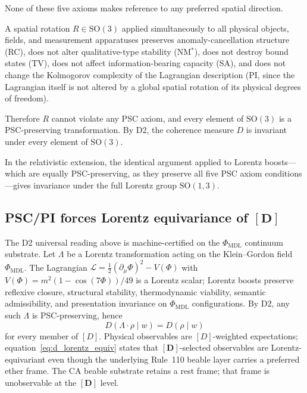 \documentclass[12pt,letterpaper]{article}
\newcommand{\Dclass}{[D]}
\begin{document}
None of these five axioms makes reference to any preferred spatial direction.

A spatial rotation $R \in \mathrm{SO}(3)$ applied simultaneously to all physical
objects, fields, and measurement apparatuses preserves anomaly-cancellation structure
(RC), does not alter qualitative-type stability (NM$^*$), does not destroy bound
states (TV), does not affect information-bearing capacity (SA), and does not change
the Kolmogorov complexity of the Lagrangian description (PI, since the Lagrangian
itself is not altered by a global spatial rotation of its physical degrees of
freedom).

Therefore $R$ cannot violate any PSC axiom, and every element of $\mathrm{SO}(3)$ is
a PSC-preserving transformation.  By D2, the coherence measure $D$ is invariant under
every element of $\mathrm{SO}(3)$.

In the relativistic extension, the identical argument applied to Lorentz
boosts---which are equally PSC-preserving, as they preserve all five PSC axiom
conditions---gives invariance under the full Lorentz group $\mathrm{SO}(1,3)$.

\subsection{PSC/PI forces Lorentz equivariance of \texorpdfstring{$[\mathbf{D}]$}{[D]}}
\label{sec:psc_pi_lorentz}

The D2 universal reading above is machine-certified on the $\Phi_{\mathrm{MDL}}$
continuum substrate.
Let $\Lambda$ be a Lorentz transformation acting on the Klein--Gordon field
$\Phi_{\mathrm{MDL}}$.
The Lagrangian
$\mathcal{L} = \tfrac{1}{2}(\partial_\mu\Phi)^2 - V(\Phi)$ with
$V(\Phi) = m^2(1-\cos(7\Phi))/49$ is a Lorentz scalar; Lorentz boosts preserve
reflexive closure, structural stability, thermodynamic viability, semantic
admissibility, and presentation invariance on $\Phi_{\mathrm{MDL}}$ configurations.
By D2, any such $\Lambda$ is PSC-preserving, hence
\begin{equation}
  D(\Lambda\cdot\rho \mid w) = D(\rho \mid w)
  \label{eq:d_lorentz_equiv}
\end{equation}
for every member of $\Dclass$.
Physical observables are $\Dclass$-weighted expectations; equation~\eqref{eq:d_lorentz_equiv}
states that $[\mathbf{D}]$-selected observables are Lorentz-equivariant even though the
underlying Rule~110 beable layer carries a preferred ether frame.
The CA beable substrate retains a rest frame; that frame is unobservable at the
$[\mathbf{D}]$ level.
\end{document}
